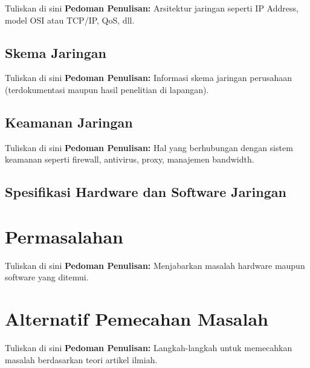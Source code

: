 Tuliskan di sini \textbf{Pedoman Penulisan:} Arsitektur jaringan seperti IP Address, model OSI atau TCP/IP, QoS, dll.


\subsection{Skema Jaringan}


Tuliskan di sini \textbf{Pedoman Penulisan:} Informasi skema jaringan perusahaan (terdokumentasi maupun hasil penelitian di lapangan).


\subsection{Keamanan Jaringan}


Tuliskan di sini \textbf{Pedoman Penulisan:} Hal yang berhubungan dengan sistem keamanan seperti firewall, antivirus, proxy, manajemen bandwidth.


\subsection{Spesifikasi Hardware dan Software Jaringan}
\section{Permasalahan}


Tuliskan di sini \textbf{Pedoman Penulisan:} Menjabarkan masalah hardware maupun software yang ditemui.


\section{Alternatif Pemecahan Masalah}


Tuliskan di sini \textbf{Pedoman Penulisan:} Langkah-langkah untuk memecahkan masalah berdasarkan teori artikel ilmiah.


